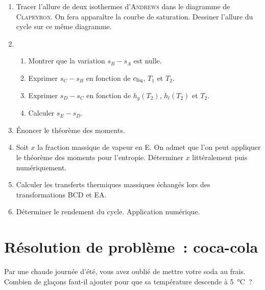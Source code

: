 \documentclass[a4paper, 10pt, final, garamond]{book}
\begin{document}
\begin{enumerate}
	\item Tracer l'allure de deux isothermes d'\textsc{Andrews} dans le diagramme
	      de \textsc{Clapeyron}. On fera apparaître la courbe de saturation. Dessiner
	      l'allure du cycle sur ce même diagramme.
	\item
	      \begin{enumerate}
		      \item Montrer que la variation $s_B - s_A$ est nulle.
		      \item Exprimer $s_C - s_B$ en fonction de $c_{\rm liq}$, $T_1$ et $T_2$.
		      \item Exprimer $s_D - s_C$ en fonction de $h_g(T_2)$, $h_l(T_2)$ et $T_2$.
		      \item Calculer $s_E - s_D$.
	      \end{enumerate}
	\item Énoncer le théorème des moments.
	\item Soit $x$ la fraction massique de vapeur en E. On admet que l'on peut
	      appliquer le théorème des moments pour l'entropie. Déterminer $x$
	      littéralement puis numériquement.
	\item Calculer les transferts thermiques massiques échangés lors des
	      transformations BCD et EA.
	\item Déterminer le rendement du cycle. Application numérique.
\end{enumerate}

\section{Résolution de problème~: coca-cola}
Par une chaude journée d'été, vous avez oublié de mettre votre soda au frais.
Combien de glaçons faut-il ajouter pour que sa température descende à
\SI{5}{\degreeCelsius}~?
\end{document}
